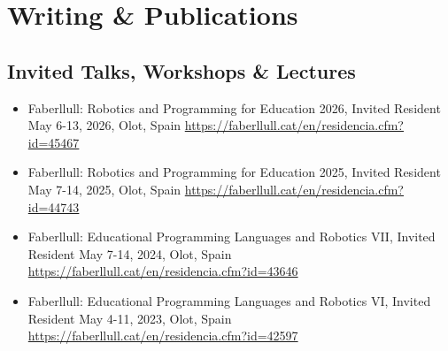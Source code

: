 \section{Writing \& Publications}
\vspace{6pt}

\subsection{Invited Talks, Workshops \& Lectures}

\vspace{5pt}

\begin{itemize}
    \setlength\itemsep{1em}
    \item{Faberllull: Robotics and Programming for Education 2026, Invited Resident
    \newline
    May 6-13, 2026, Olot, Spain
    \newline
    \href{https://faberllull.cat/en/residencia.cfm?id=45467&url=programacio-robotica-educatives-2026.htm}{https://faberllull.cat/en/residencia.cfm?id=45467}
    }

    \item{Faberllull: Robotics and Programming for Education 2025, Invited Resident
    \newline
    May 7-14, 2025, Olot, Spain
    \newline
    \href{https://faberllull.cat/en/residencia.cfm?id=44743&url=programacio-robotica-educatives-2025.htm}{https://faberllull.cat/en/residencia.cfm?id=44743}
    }


    \item{Faberllull: Educational Programming Languages and Robotics VII, Invited Resident
    \newline
    May 7-14, 2024, Olot, Spain
    \newline
    \href{https://faberllull.cat/en/residencia.cfm?id=43646&url=educational-programming-and-robotics-2024.htm}{https://faberllull.cat/en/residencia.cfm?id=43646}}

    \item{Faberllull: Educational Programming Languages and Robotics VI, Invited Resident
    \newline
    May 4-11, 2023, Olot, Spain
    \newline
    \href{https://faberllull.cat/en/residencia.cfm?id=42597\&url=educational-programming-and-robotics-vi.htm}{https://faberllull.cat/en/residencia.cfm?id=42597}}
    

\end{itemize}
